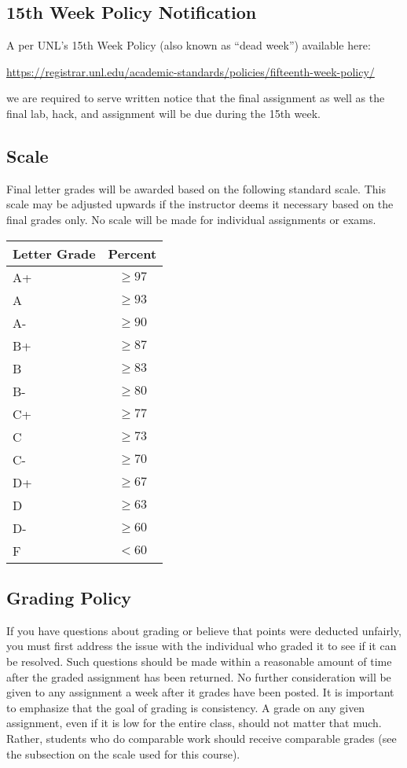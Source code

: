 \documentclass[12pt]{scrartcl}
\begin{document}
\subsection{15th Week Policy Notification}
\label{subsection:deadweek}

A per UNL's 15th Week Policy (also known as ``dead week'') available here: 

\url{https://registrar.unl.edu/academic-standards/policies/fifteenth-week-policy/}

we are required to serve written notice that the final assignment
as well as the final lab, hack, and assignment will be due during the 15th 
week.

\subsection{Scale}

Final letter grades will be awarded based on the following 
standard scale. This scale may be adjusted upwards if the 
instructor deems it necessary based on the final grades only.  
No scale will be made for individual assignments or exams.

\begin{table}[h]
\centering
\begin{tabular}{p{1cm}c}
Letter Grade & Percent \\
\hline\hline
A+ & $\geq 97$ \\
A  & $\geq 93$ \\
A- & $\geq 90$ \\
B+ & $\geq 87$ \\
B  & $\geq 83$ \\
B- & $\geq 80$ \\
C+ & $\geq 77$ \\
C  & $\geq 73$ \\
C- & $\geq 70$ \\
D+ & $\geq 67$ \\
D  & $\geq 63$ \\
D- & $\geq 60$ \\
F  & $<60$ \\
\end{tabular}
\end{table}

\subsection{Grading Policy}

If you have questions about grading or believe that points were 
deducted unfairly, you must first address the issue with the 
individual who graded it to see if it can be resolved.  Such 
questions should be made within a reasonable amount of time 
after the graded assignment has been returned.  No further 
consideration will be given to any assignment a week after 
it grades have been posted.  It is important to emphasize that 
the goal of grading is consistency.  A grade on any given 
assignment, even if it is low for the entire class, should 
not matter that much.  Rather, students who do comparable 
work should receive comparable grades (see the subsection 
on the scale used for this course).
\end{document}
